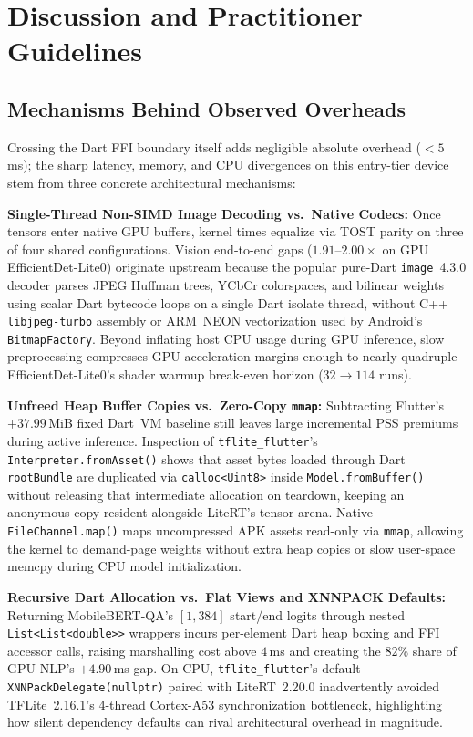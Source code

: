 \section{Discussion and Practitioner Guidelines}\label{sec:discussion}

\subsection{Mechanisms Behind Observed Overheads}
Crossing the Dart FFI boundary itself adds negligible absolute overhead ($< 5$\,ms); the sharp latency, memory, and CPU divergences on this entry-tier device stem from three concrete architectural mechanisms:

\textbf{Single-Thread Non-SIMD Image Decoding vs.\ Native Codecs:} Once tensors enter native GPU buffers, kernel times equalize via TOST parity on three of four shared configurations. Vision end-to-end gaps ($1.91\text{--}2.00\times$ on GPU EfficientDet-Lite0) originate upstream because the popular pure-Dart \texttt{image}~4.3.0 decoder parses JPEG Huffman trees, YCbCr colorspaces, and bilinear weights using scalar Dart bytecode loops on a single Dart isolate thread, without C++ \texttt{libjpeg-turbo} assembly or ARM~NEON vectorization used by Android's \texttt{BitmapFactory}. Beyond inflating host CPU usage during GPU inference, slow preprocessing compresses GPU acceleration margins enough to nearly quadruple EfficientDet-Lite0's shader warmup break-even horizon ($32 \to 114$ runs).

\textbf{Unfreed Heap Buffer Copies vs.\ Zero-Copy \texttt{mmap}:} Subtracting Flutter's $+37.99$\,MiB fixed Dart~VM baseline still leaves large incremental PSS premiums during active inference. Inspection of \texttt{tflite\_flutter}'s \texttt{Interpreter.fromAsset()} shows that asset bytes loaded through Dart \texttt{rootBundle} are duplicated via \texttt{calloc<Uint8>} inside \texttt{Model.fromBuffer()} without releasing that intermediate allocation on teardown, keeping an anonymous copy resident alongside LiteRT's tensor arena. Native \texttt{FileChannel.map()} maps uncompressed APK assets read-only via \texttt{mmap}, allowing the kernel to demand-page weights without extra heap copies or slow user-space memcpy during CPU model initialization.

\textbf{Recursive Dart Allocation vs.\ Flat Views and XNNPACK Defaults:} Returning MobileBERT-QA's $[1, 384]$ start/end logits through nested \texttt{List<List<double>{}>} wrappers incurs per-element Dart heap boxing and FFI accessor calls, raising marshalling cost above $4$\,ms and creating the $82\%$ share of GPU NLP's $+4.90$\,ms gap. On CPU, \texttt{tflite\_flutter}'s default \texttt{XNNPackDelegate(nullptr)} paired with LiteRT~2.20.0 inadvertently avoided TFLite~2.16.1's 4-thread Cortex-A53 synchronization bottleneck, highlighting how silent dependency defaults can rival architectural overhead in magnitude.

